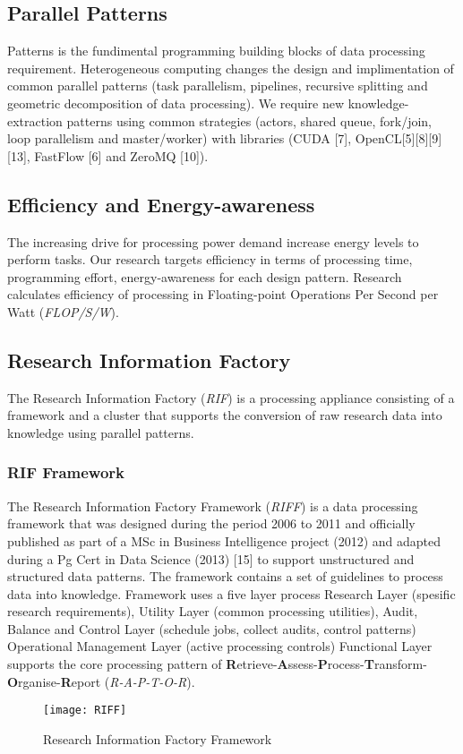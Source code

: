 \documentclass{acm_proc_article-sp}
\begin{document}
\subsection{Parallel Patterns}
Patterns is the fundimental programming building blocks of data processing requirement. Heterogeneous computing changes the design and implimentation of common parallel patterns (task parallelism, pipelines, recursive splitting and geometric decomposition of data processing). We require new knowledge-extraction patterns using common strategies (actors, shared queue, fork/join, loop parallelism and master/worker) with libraries (CUDA [7], OpenCL[5][8][9][13], FastFlow [6] and ZeroMQ [10]).
\subsection{Efficiency and Energy-awareness}
The increasing drive for processing power demand increase energy levels to perform tasks. Our research targets efficiency in terms of processing time, programming effort, energy-awareness for each design pattern. Research calculates efficiency of processing in Floating-point Operations Per Second per Watt (\textit{FLOP/S/W}). 
\subsection{Research Information Factory}
The Research Information Factory (\textit{RIF}) is a processing appliance consisting of a framework and a cluster that supports the conversion of raw research data into knowledge using parallel patterns. 
\subsubsection{RIF Framework}
The Research Information Factory Framework (\textit{RIFF}) is a data processing framework that was designed 
during the period 2006 to 2011 and officially published as part of a MSc in Business Intelligence project (2012) and adapted during a Pg Cert in Data Science (2013) [15] to support unstructured and structured data patterns.  
The framework contains a set of guidelines to process data into knowledge. 
Framework uses a five layer process Research Layer (spesific research requirements), Utility Layer (common processing utilities), Audit, Balance and Control Layer (schedule jobs, collect audits, control patterns)
Operational Management Layer (active processing controls) Functional Layer supports the core processing pattern of \textbf{R}etrieve-\textbf{A}ssess-\textbf{P}rocess-\textbf{T}ransform-\textbf{O}rganise-\textbf{R}eport (\textit{R-A-P-T-O-R}). 
\begin{figure}
  \centering
  \texttt{[image: RIFF]}
  \caption{Research Information Factory Framework}
\end{figure}
\end{document}
